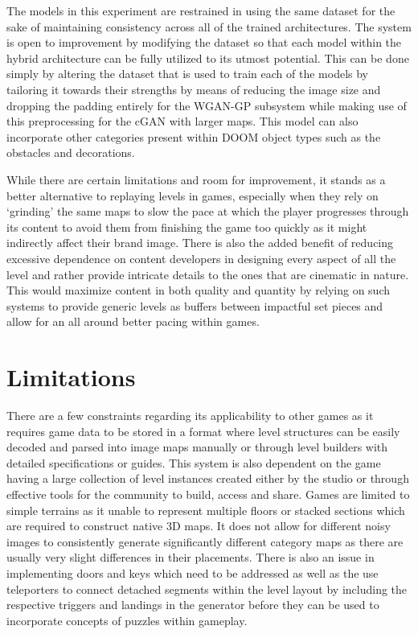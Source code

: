 \documentclass{Configuration_Files/PoliMi3i_thesis}
\begin{document}
The models in this experiment are restrained in using the same dataset for the sake of 
maintaining consistency across all of the trained architectures. The system is open to 
improvement by modifying the dataset so that each model within the hybrid 
architecture can be fully utilized to its utmost potential. This can be done simply by 
altering the dataset that is used to train each of the models by tailoring it towards 
their strengths by means of reducing the image size and dropping the padding
entirely for the WGAN-GP subsystem while making use of this preprocessing for the 
cGAN with larger maps. This model can also incorporate other categories present within 
DOOM object types such as the obstacles and decorations.

While there are certain limitations and room for improvement, it stands as a better 
alternative to replaying levels in games, especially when they rely on ‘grinding’ 
the same maps to slow the pace at which the player progresses through its content 
to avoid them from finishing the game too quickly as it might indirectly affect their brand 
image. There is also the added benefit of reducing excessive dependence on content 
developers in designing every aspect of all the level and rather provide  intricate details 
to the ones that are cinematic in nature. This would maximize content in both quality and 
quantity by relying on such systems to provide generic levels as buffers between impactful 
set pieces and allow for an all around better pacing within games.

\section{Limitations}
There are a few constraints regarding its applicability to other games as it requires 
game data to be stored in a format where level structures can be easily decoded and 
parsed into image maps manually or through level builders with detailed 
specifications or guides. This system is also dependent on the game having a large 
collection of level instances created either by the studio or through effective tools for 
the community to build, access and share. Games are limited to simple terrains as it 
unable to represent multiple floors or stacked sections which are required to construct 
native 3D maps. It does not allow for different noisy images to consistently generate
significantly different category maps as there are usually very slight differences in 
their placements. There is also an issue in implementing doors and keys which need 
to be addressed as well as the use teleporters to connect detached segments within 
the level layout by including the respective triggers and landings in the generator 
before they can be used to incorporate concepts of puzzles within gameplay. 
\end{document}

